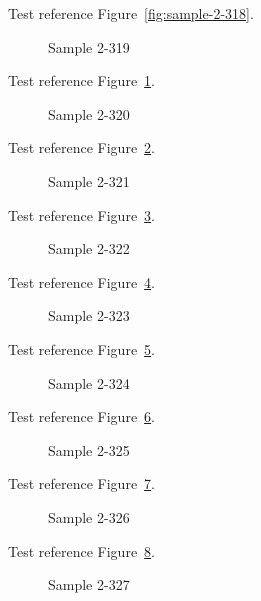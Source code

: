 Test reference Figure~\ref{fig:sample-2-318}.

\begin{figure}[tbhp]
\caption{Sample 2-319}
\label{fig:sample-2-319}
\end{figure}

Test reference Figure~\ref{fig:sample-2-319}.

\begin{figure}[tbhp]
\caption{Sample 2-320}
\label{fig:sample-2-320}
\end{figure}

Test reference Figure~\ref{fig:sample-2-320}.

\begin{figure}[tbhp]
\caption{Sample 2-321}
\label{fig:sample-2-321}
\end{figure}

Test reference Figure~\ref{fig:sample-2-321}.

\begin{figure}[tbhp]
\caption{Sample 2-322}
\label{fig:sample-2-322}
\end{figure}

Test reference Figure~\ref{fig:sample-2-322}.

\begin{figure}[tbhp]
\caption{Sample 2-323}
\label{fig:sample-2-323}
\end{figure}

Test reference Figure~\ref{fig:sample-2-323}.

\begin{figure}[tbhp]
\caption{Sample 2-324}
\label{fig:sample-2-324}
\end{figure}

Test reference Figure~\ref{fig:sample-2-324}.

\begin{figure}[tbhp]
\caption{Sample 2-325}
\label{fig:sample-2-325}
\end{figure}

Test reference Figure~\ref{fig:sample-2-325}.

\begin{figure}[tbhp]
\caption{Sample 2-326}
\label{fig:sample-2-326}
\end{figure}

Test reference Figure~\ref{fig:sample-2-326}.

\begin{figure}[tbhp]
\caption{Sample 2-327}
\label{fig:sample-2-327}
\end{figure}

